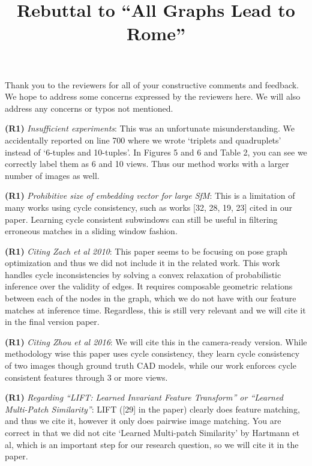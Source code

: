 \documentclass[10pt,twocolumn,letterpaper]{article}
\begin{document}
\title{Rebuttal to ``All Graphs Lead to Rome''}  %

\maketitle
\thispagestyle{empty}


Thank you to the reviewers for all of your constructive comments and feedback.
We hope to address some concerns expressed by the reviewers here.
We will also address any concerns or typos not mentioned.

\textbf{(R1)} \textit{Insufficient experiments}:
This was an unfortunate misunderstanding.
We accidentally reported on line 700 where we wrote `triplets and quadruplets' instead of `6-tuples and 10-tuples'.
In Figures 5 and 6 and Table 2, you can see we correctly label them as 6 and 10 views.
Thus our method works with a larger number of images as well.

\textbf{(R1)} \textit{Prohibitive size of embedding vector for large SfM}:
This is a limitation of many works using cycle consistency, such as works [32, 28, 19, 23] cited in our paper.
Learning cycle consistent subwindows can still be useful in filtering erroneous matches in a sliding window fashion.

\textbf{(R1)} \textit{Citing Zach et al 2010}:
This paper seems to be focusing on pose graph optimization and thus we did not include it in the related work.
This work handles cycle inconsistencies by solving a convex relaxation of probabilistic inference over the validity of edges.
It requires composable geometric relations between each of the nodes in the graph, which we do not have with our feature matches at inference time.
Regardless, this is still very relevant and we will cite it in the final version paper.

\textbf{(R1)} \textit{Citing Zhou et al 2016}:
We will cite this in the camera-ready version.
While methodology wise this paper uses cycle consistency, they learn cycle consistency of two images though ground truth CAD models, while our work enforces cycle consistent features through 3 or more views.

\textbf{(R1)} \textit{Regarding ``LIFT: Learned Invariant Feature Transform'' or ``Learned Multi-Patch Similarity''}:
LIFT ([29] in the paper) clearly does feature matching, and thus we cite it, however it only does pairwise image matching.
You are correct in that we did not cite `Learned Multi-patch Similarity' by Hartmann et al, which is an important step for our research question, so we will cite it in the paper.
\end{document}
